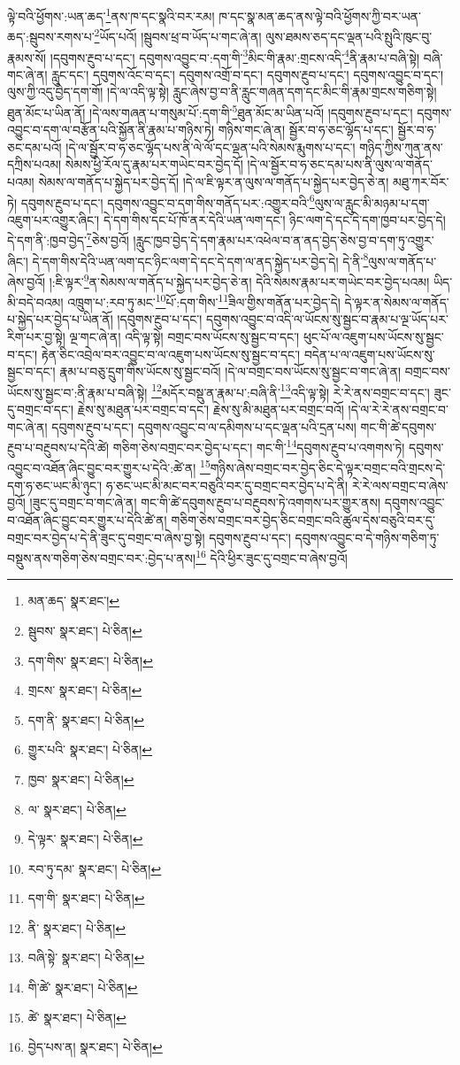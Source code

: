 ལྟེ་བའི་ཕྱོགས་:ཡན་ཆད་\footnote{མན་ཆད་  སྣར་ཐང་། }ནས་ཁ་དང་སྣའི་བར་རམ། ཁ་དང་སྣ་མན་ཆད་ནས་ལྟེ་བའི་ཕྱོགས་ཀྱི་བར་ཡན་ཆད་:སྦུབས་རགས་པ་\footnote{སྦུབས་  སྣར་ཐང་།  པེ་ཅིན། }ཡོད་པའོ། །སྦུབས་ཕྲ་བ་ཡོད་པ་གང་ཞེ་ན། ལུས་ཐམས་ཅད་དང་ལྡན་པའི་སྤུའི་ཁུང་བུ་རྣམས་སོ། །དབུགས་རྔུབ་པ་དང་། དབུགས་འབྱུང་བ་:དག་གི་\footnote{དག་གིས་  སྣར་ཐང་།  པེ་ཅིན། }མིང་གི་རྣམ་:གྲངས་འདི་\footnote{གྲངས་  སྣར་ཐང་།  པེ་ཅིན། }ནི་རྣམ་པ་བཞི་སྟེ། བཞི་གང་ཞེ་ན། རླུང་དང་། དབུགས་འོང་བ་དང་། དབུགས་འགྲོ་བ་དང་། དབུགས་རྔུབ་པ་དང་། དབུགས་འབྱུང་བ་དང་། ལུས་ཀྱི་འདུ་བྱེད་དག་གོ། །དེ་ལ་འདི་ལྟ་སྟེ། རླུང་ཞེས་བྱ་བ་ནི་རླུང་གཞན་དག་དང་མིང་གི་རྣམ་གྲངས་གཅིག་སྟེ། ཐུན་མོང་པ་ཡིན་ནོ། །དེ་ལས་གཞན་པ་གསུམ་པོ་:དག་གི་\footnote{དག་ནི་  སྣར་ཐང་།  པེ་ཅིན། }ཐུན་མོང་མ་ཡིན་པའོ། །དབུགས་རྔུབ་པ་དང་། དབུགས་འབྱུང་བ་དག་ལ་བརྩོན་པའི་སྐྱོན་ནི་རྣམ་པ་གཉིས་ཏེ། གཉིས་གང་ཞེ་ན། སྦྱོར་བ་ཧ་ཅང་ལྷོད་པ་དང་། སྦྱོར་བ་ཧ་ཅང་དམ་པའོ། །དེ་ལ་སྦྱོར་བ་ཧ་ཅང་ལྷོད་པས་ནི་ལེ་ལོ་དང་ལྡན་པའི་སེམས་རྨུགས་པ་དང་། གཉིད་ཀྱིས་ཀུན་ནས་དཀྲིས་པའམ། སེམས་ཕྱི་རོལ་དུ་རྣམ་པར་གཡེང་བར་བྱེད་དོ། །དེ་ལ་སྦྱོར་བ་ཧ་ཅང་དམ་པས་ནི་ལུས་ལ་གནོད་པའམ། སེམས་ལ་གནོད་པ་སྐྱེད་པར་བྱེད་དོ། །དེ་ལ་ཇི་ལྟར་ན་ལུས་ལ་གནོད་པ་སྐྱེད་པར་བྱེད་ཅེ་ན། མཐུ་ཀར་བོར་ཏེ། དབུགས་རྔུབ་པ་དང་། དབུགས་འབྱུང་བ་དག་གིས་གནོད་པར་:འགྱུར་བའི་\footnote{གྱུར་པའི་  སྣར་ཐང་།  པེ་ཅིན། }ལུས་ལ་རླུང་མི་མཉམ་པ་དག་འཇུག་པར་འགྱུར་ཞིང་། དེ་དག་གིས་དང་པོ་ཁོ་ནར་དེའི་ཡན་ལག་དང་། ཉིང་ལག་དེ་དང་དེ་དག་ཁྱབ་པར་བྱེད་དེ། དེ་དག་ནི་:ཁྱབ་བྱེད་\footnote{ཁྱབ་  སྣར་ཐང་།  པེ་ཅིན། }ཅེས་བྱའོ། །རླུང་ཁྱབ་བྱེད་དེ་དག་རྣམ་པར་འཕེལ་བ་ན་ནད་བྱེད་ཅེས་བྱ་བ་དག་ཏུ་འགྱུར་ཞིང་། དེ་དག་གིས་དེའི་ཡན་ལག་དང་ཉིང་ལག་དེ་དང་དེ་དག་ལ་ནད་སྐྱེད་པར་བྱེད་དེ། དེ་ནི་\footnote{ལ་  སྣར་ཐང་།  པེ་ཅིན། }ལུས་ལ་གནོད་པ་ཞེས་བྱའོ། །:ཇི་ལྟར་\footnote{དེ་ལྟར་  སྣར་ཐང་།  པེ་ཅིན། }ན་སེམས་ལ་གནོད་པ་སྐྱེད་པར་བྱེད་ཅེ་ན། དེའི་སེམས་རྣམ་པར་གཡེང་བར་བྱེད་པའམ། ཡིད་མི་བདེ་བའམ། འཁྲུག་པ་:རབ་ཏུ་མང་\footnote{རབ་ཏུ་དམ་  སྣར་ཐང་།  པེ་ཅིན། }པོ་:དག་གིས་\footnote{དག་གི་  སྣར་ཐང་།  པེ་ཅིན། }ཟིལ་གྱིས་གནོན་པར་བྱེད་དེ། དེ་ལྟར་ན་སེམས་ལ་གནོད་པ་སྐྱེད་པར་བྱེད་པ་ཡིན་ནོ། །དབུགས་རྔུབ་པ་དང་། དབུགས་འབྱུང་བ་འདི་ལ་ཡོངས་སུ་སྦྱང་བ་རྣམ་པ་ལྔ་ཡོད་པར་རིག་པར་བྱ་སྟེ། ལྔ་གང་ཞེ་ན། འདི་ལྟ་སྟེ། བགྲང་བས་ཡོངས་སུ་སྦྱང་བ་དང་། ཕུང་པོ་ལ་འཇུག་པས་ཡོངས་སུ་སྦྱང་བ་དང་། རྟེན་ཅིང་འབྲེལ་བར་འབྱུང་བ་ལ་འཇུག་པས་ཡོངས་སུ་སྦྱང་བ་དང་། བདེན་པ་ལ་འཇུག་པས་ཡོངས་སུ་སྦྱང་བ་དང་། རྣམ་པ་བཅུ་དྲུག་གིས་ཡོངས་སུ་སྦྱང་བའོ། །དེ་ལ་བགྲང་བས་ཡོངས་སུ་སྦྱང་བ་གང་ཞེ་ན། བགྲང་བས་ཡོངས་སུ་སྦྱང་བ་:ནི་རྣམ་པ་བཞི་སྟེ། \footnote{ནི་  སྣར་ཐང་།  པེ་ཅིན། }མདོར་བསྡུ་ན་རྣམ་པ་:བཞི་ནི་\footnote{བཞི་སྟེ་  སྣར་ཐང་།  པེ་ཅིན། }འདི་ལྟ་སྟེ། རེ་རེ་ནས་བགྲང་བ་དང་། ཟུང་དུ་བགྲང་བ་དང་། རྗེས་སུ་མཐུན་པར་བགྲང་བ་དང་། རྗེས་སུ་མི་མཐུན་པར་བགྲང་བའོ། །དེ་ལ་རེ་རེ་ནས་བགྲང་བ་གང་ཞེ་ན། དབུགས་རྔུབ་པ་དང་། དབུགས་འབྱུང་བ་ལ་དམིགས་པ་དང་ལྡན་པའི་དྲན་པས། གང་གི་ཚེ་དབུགས་རྔུབ་པ་བརྔུབས་པ་དེའི་ཚེ། གཅིག་ཅེས་བགྲང་བར་བྱེད་པ་དང་། གང་གི་\footnote{གི་ཚེ་  སྣར་ཐང་།  པེ་ཅིན། }དབུགས་རྔུབ་པ་འགགས་ཏེ། དབུགས་འབྱུང་བ་འཐོན་ཞིང་བྱུང་བར་གྱུར་པ་དེའི་:ཚེ་ན། \footnote{ཚེ་  སྣར་ཐང་།  པེ་ཅིན། }གཉིས་ཞེས་བགྲང་བར་བྱེད་ཅིང་དེ་ལྟར་བགྲང་བའི་གྲངས་དེ་དག་ཧ་ཅང་ཡང་མི་ཉུང་། ཧ་ཅང་ཡང་མི་མང་བར་བཅུའི་བར་དུ་བགྲང་བར་བྱེད་པ་དེ་ནི། རེ་རེ་ལས་བགྲང་བ་ཞེས་བྱའོ། །ཟུང་དུ་བགྲང་བ་གང་ཞེ་ན། གང་གི་ཚེ་དབུགས་རྔུབ་པ་བརྔུབས་ཏེ་འགགས་པར་གྱུར་ནས། དབུགས་འབྱུང་བ་འཐོན་ཞིང་བྱུང་བར་གྱུར་པ་དེའི་ཚེ་ན། གཅིག་ཅེས་བགྲང་བར་བྱེད་ཅིང་བགྲང་བའི་ཚུལ་དེས་བཅུའི་བར་དུ་བགྲང་བར་བྱེད་པ་དེ་ནི་ཟུང་དུ་བགྲང་བ་ཞེས་བྱ་སྟེ། དབུགས་རྔུབ་པ་དང་། དབུགས་འབྱུང་བ་དེ་གཉིས་གཅིག་ཏུ་བསྡུས་ནས་གཅིག་ཅེས་བགྲང་བར་:བྱེད་པ་ནས།\footnote{བྱེད་པས་ན།  སྣར་ཐང་།  པེ་ཅིན། } དེའི་ཕྱིར་ཟུང་དུ་བགྲང་བ་ཞེས་བྱའོ། 